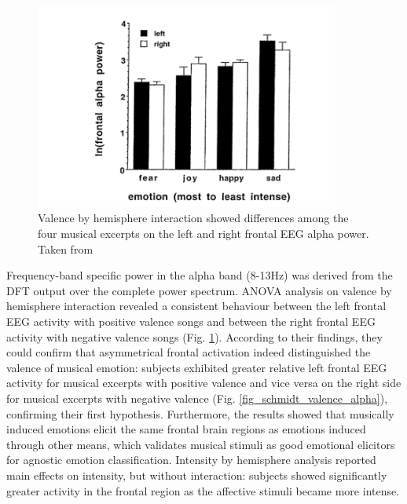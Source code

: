 \begin{figure}[h!]
\includegraphics[width=10cm]{img/related_work/valence_hemisphere.png}
\centering
\caption{Valence by hemisphere interaction showed differences among the four musical excerpts on the left and right frontal EEG alpha power. Taken from \cite{schmidt_frontal_2001}}\label{fig_schmidt_valence_emo}
\end{figure}
Frequency-band specific power in the alpha band (8-13Hz) was derived from the \ac{DFT} output over the complete power spectrum. ANOVA analysis on valence by hemisphere interaction revealed a consistent behaviour between the left frontal EEG activity with positive valence songs and between the right frontal \ac{EEG} activity with negative valence songs (Fig. \ref{fig_schmidt_valence_emo}).
According to their findings, they could confirm that asymmetrical frontal activation indeed distinguished the valence of musical emotion: subjects exhibited greater relative left frontal EEG activity for musical excerpts with positive valence and vice versa on the right side for musical excerpts with negative valence (Fig. \ref{fig_schmidt_valence_alpha}), confirming their first hypothesis. Furthermore, the results showed that musically induced emotions elicit the same frontal brain regions as emotions induced through other means, which validates musical stimuli as good emotional elicitors for agnostic emotion classification. Intensity by hemisphere analysis reported main effects on intensity, but without interaction: subjects showed significantly greater activity in the frontal region as the affective stimuli became more intense. 

